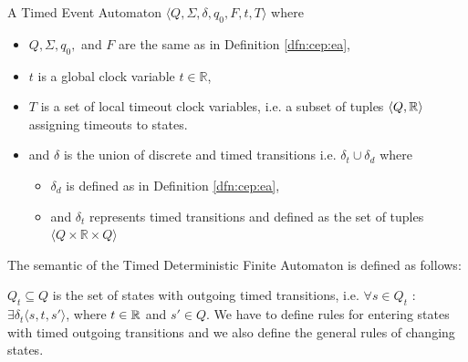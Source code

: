 				\begin{dfn}
					\label{dfn:cep:tea}
					A Timed Event Automaton $\langle Q,\Sigma,\delta,q_0, F, t, T \rangle$ where
					\begin{itemize}
						\item $Q, \Sigma, q_0,$ and $F$ are the same as in Definition \ref{dfn:cep:ea},
						\item $t$ is a global clock variable $t \in \mathbb{R}$,
						\item $T$ is a set of local timeout clock variables, i.e. a subset of tuples $\langle Q, \mathbb{R} \rangle$ assigning timeouts to states.
						\item and $\delta$ is the union of discrete and timed transitions i.e. $\delta_t \cup \delta_d$ where
						\begin{itemize}
							\item $\delta_d$ is defined as in Definition \ref{dfn:cep:ea},
							\item and $\delta_t$ represents timed transitions and defined as the set of tuples $\langle Q \times \mathbb{R} \times Q \rangle$ 
						\end{itemize}
					\end{itemize}
				\end{dfn}
				
				The semantic of the Timed Deterministic Finite Automaton is defined as follows:
				
				$Q_t \subseteq Q$ is the set of states with outgoing timed transitions, 
				i.e. $\forall s \in Q_t$ : $ \exists \delta_t\langle s, t, s' \rangle$, where $t \in \mathbb{R}$ and $s' \in Q$.
				We have to define rules for entering states with timed outgoing transitions and we also define the general rules of changing states. 
				

